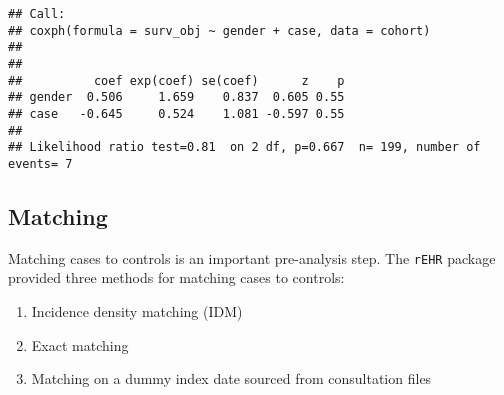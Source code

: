 \documentclass[]{article}
\newenvironment{Shaded}{\begin{snugshade}}{\end{snugshade}}
\newcommand{\KeywordTok}[1]{\textcolor[rgb]{0.13,0.29,0.53}{\textbf{{#1}}}}
\newcommand{\DataTypeTok}[1]{\textcolor[rgb]{0.13,0.29,0.53}{{#1}}}
\newcommand{\DecValTok}[1]{\textcolor[rgb]{0.00,0.00,0.81}{{#1}}}
\newcommand{\StringTok}[1]{\textcolor[rgb]{0.31,0.60,0.02}{{#1}}}
\newcommand{\NormalTok}[1]{{#1}}
\begin{document}
\begin{Shaded}
\end{Shaded}

\begin{verbatim}
## Call:
## coxph(formula = surv_obj ~ gender + case, data = cohort)
## 
## 
##          coef exp(coef) se(coef)      z    p
## gender  0.506     1.659    0.837  0.605 0.55
## case   -0.645     0.524    1.081 -0.597 0.55
## 
## Likelihood ratio test=0.81  on 2 df, p=0.667  n= 199, number of events= 7
\end{verbatim}

\subsection{Matching}\label{matching}

Matching cases to controls is an important pre-analysis step. The
\texttt{rEHR} package provided three methods for matching cases to
controls:

\begin{enumerate}
\def\labelenumi{\arabic{enumi}.}
\itemsep1pt\parskip0pt
\item
  Incidence density matching (IDM)
\item
  Exact matching
\item
  Matching on a dummy index date sourced from consultation files
\end{enumerate}
\end{document}
